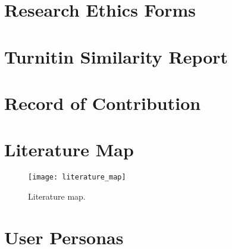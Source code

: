 %
%
%                 

\chapter{Research Ethics Forms}
\label{sec:appendixa}

\chapter{Turnitin Similarity Report}
\label{sec:appendixb}

\chapter{Record of Contribution}


\begin{comment}
\chapter{Design Artifacts}
\label{sec:appendixd}

\section{Affinity Diagram}
\newpage
\end{comment}

\chapter{Literature Map}
  \label{sec:appendixe}


  \begin{sidewaysfigure}[h]
    \texttt{[image: literature\_map]}
      \caption{Literature map.}
      \label{fig:literature-map}
  \end{sidewaysfigure}

\chapter{User Personas}
\label{sec:user-personas}

